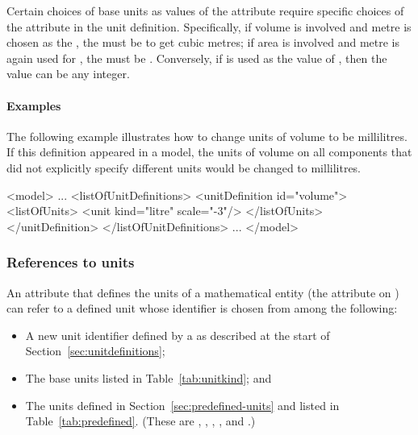 \begin{blockChanged}

Certain choices of base units as values of the 
attribute require specific choices of the 
attribute in the unit definition.  Specifically, if volume is
involved and metre is chosen as the , the
 must be  to get cubic metres; if area is
involved and metre is again used for , the
 must be .  Conversely, if
 is used as the value of , then
the  value can be any integer.

\end{blockChanged}


\paragraph{Examples}

The following example illustrates how to change  units
of volume to be millilitres.  If this definition appeared in a
model, the units of volume on all components that did not
explicitly specify different units would be changed to
millilitres.
\begin{example}
<model>
    ...
    <listOfUnitDefinitions>
        <unitDefinition id="volume">
            <listOfUnits>
                <unit kind="litre" scale="-3"/>
            </listOfUnits>
        </unitDefinition>
    </listOfUnitDefinitions>
    ...
</model>
\end{example}


\subsubsection{References to units}

An attribute that defines the units of a mathematical entity (\eg the
attribute  on \Parameter) can refer to a defined unit
whose identifier is chosen from among the following:
\begin{itemize}
  
\item A new unit identifier defined by a \UnitDefinition as
  described at the start of Section~\ref{sec:unitdefinitions};

\item The base units listed in Table~\vref{tab:unitkind}; and
  
\item The  units defined in
  Section~\ref{sec:predefined-units} and listed in
  Table~\ref{tab:predefined}.  (These are ,
  , , , and .)

\end{itemize}

